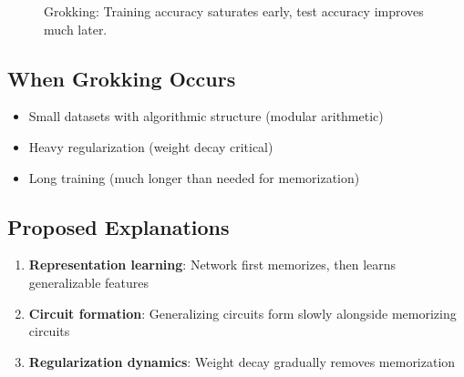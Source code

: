 \begin{figure}[H]
\centering
{}
\caption{Grokking: Training accuracy saturates early, test accuracy improves much later.}
\end{figure}

\subsection{When Grokking Occurs}

\begin{itemize}
    \item Small datasets with algorithmic structure (modular arithmetic)
    \item Heavy regularization (weight decay critical)
    \item Long training (much longer than needed for memorization)
\end{itemize}

\subsection{Proposed Explanations}

\begin{enumerate}
    \item \textbf{Representation learning}: Network first memorizes, then learns generalizable features
    \item \textbf{Circuit formation}: Generalizing circuits form slowly alongside memorizing circuits
    \item \textbf{Regularization dynamics}: Weight decay gradually removes memorization
\end{enumerate}

